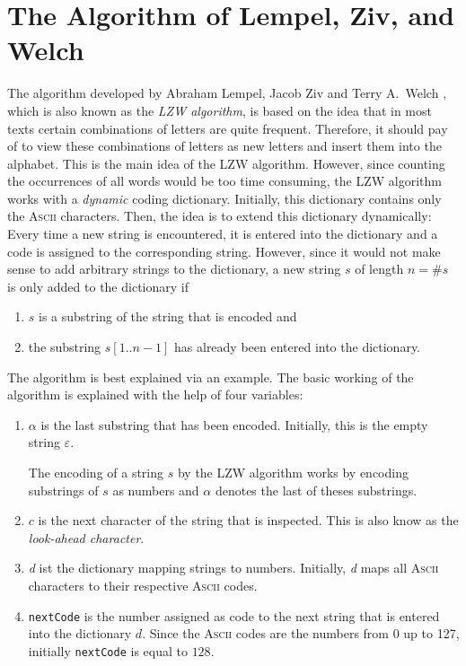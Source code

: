 \section[LZW Algorithm]{The Algorithm  of Lempel, Ziv, and Welch}
The algorithm developed by Abraham Lempel, Jacob Ziv \cite{ziv:77,ziv:78} and Terry A.~Welch
\cite{welch:84}, which is also known as the \emph{LZW algorithm}, is based on the idea that in most
texts certain combinations of letters are quite frequent.  Therefore, it should pay of to view
these combinations of letters as new letters and insert them into the alphabet.  This is the main
idea of the LZW algorithm.  However, since counting the occurrences of all words would be too time
consuming, the LZW algorithm works with a \emph{dynamic} coding dictionary.  Initially, this dictionary
contains only the \textsc{Ascii} characters.  Then, the idea is to extend this dictionary
dynamically: Every time a new string is encountered, it is entered into the dictionary and a code is
assigned to the corresponding string.  However, since it would not make sense to add arbitrary
strings to the dictionary, a new string $s$ of length $n=\#s$ is only added to the dictionary if
\begin{enumerate}
\item $s$ is a substring of the string that is encoded and
\item the substring $s[1..n-1]$ has already been entered into the dictionary.  
\end{enumerate} 
The algorithm is best
explained via an example.  The basic working of the algorithm is explained with the help of four
variables:
\begin{enumerate}
\item $\alpha$ is the last substring that has been encoded.  Initially, this is the empty string
      $\varepsilon$.
  
      The encoding of a string $s$ by the LZW algorithm works by encoding substrings of $s$ as
      numbers and $\alpha$ denotes the last of theses substrings.
\item $c$ is the next character of the string that is inspected.  This is also know as the
      \emph{look-ahead character}.
\item \textsl{d} ist the dictionary mapping strings to numbers.  Initially, \textsl{d} maps all
      \textsc{Ascii} characters to their respective \textsc{Ascii} codes.
\item \texttt{nextCode} is the number assigned as code to the next string that is entered into
      the dictionary $d$.  Since the \textsc{Ascii} codes are the numbers from 0 up to 127,
      initially \texttt{nextCode} is equal to $128$.
\end{enumerate}
